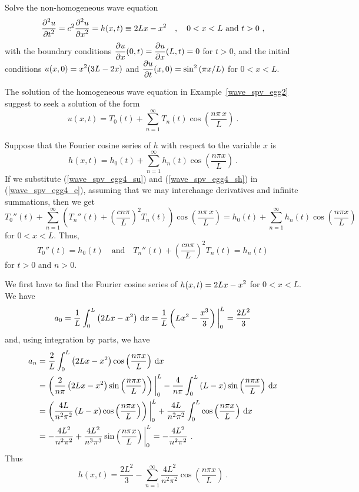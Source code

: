 \begin{egg}
Solve the non-homogeneous wave equation
\begin{equation} \label{wave_spv_egg4_e}
\frac{\displaystyle \partial^{2}{u}} {\displaystyle \partial t^{2}} = c^2 \frac{\displaystyle \partial^{2}{u}} {\displaystyle \partial x^{2}} = h(x,t) \equiv 2Lx-x^2 \quad ,
\quad 0 < x < L \text{ and } t>0 \ ,
\end{equation}
with the boundary conditions
$\displaystyle \frac{\partial{u}}{\partial x}(0,t) = \frac{\partial{u}}{\partial x}(L,t) = 0$ for
$t>0$, and the initial conditions
$\displaystyle u(x,0) = x^2(3L-2x)$ and
$\displaystyle \frac{\partial{u}}{\partial t}(x,0) = \sin^2\left(\pi x/L\right)$ for
$0<x<L$.

The solution of the homogeneous wave equation in
Example~\ref{wave_spv_egg2} suggest to seek a solution of the form
\begin{equation} \label{wave_spv_egg4_su}
u(x,t) = T_0(t) + \sum_{n=1}^\infty T_n(t)
\cos\left(\frac{n\pi\,x}{L}\right) \ .
\end{equation}

Suppose that the Fourier cosine series of $h$ with respect to the
variable $x$ is
\begin{equation} \label{wave_spv_egg4_sh}
h(x,t) = h_0(t) +  \sum_{n=1}^\infty h_n(t) \cos\left(\frac{n\pi x}{L}\right) \ .
\end{equation}
If we substitute (\ref{wave_spv_egg4_su}) and (\ref{wave_spv_egg4_sh}) in
(\ref{wave_spv_egg4_e}), assuming that we may interchange derivatives and
infinite summations, then we get
\[
T_0''(t) + \sum_{n=1}^\infty \left( T_n''(t) +
\left(\frac{c n\pi}{L}\right)^2 T_n(t) \right)
\cos\left(\frac{n\pi\,x}{L}\right) =
h_0(t) +  \sum_{n=1}^\infty h_n(t) \cos\left(\frac{n\pi x}{L}\right)
\]
for $0<x<L$.  Thus,
\[
T_0''(t)  = h_0(t) \quad \text{and} \quad
T_n''(t) + \left(\frac{c n\pi}{L}\right)^2 T_n(t) = h_n(t)
\]
for $t>0$ and $n>0$.

We first have to find the Fourier cosine series of
$\displaystyle h(x,t) = 2Lx-x^2$ for $0<x<L$.  We have
\[
a_0 = \frac{1}{L}\int_0^L \left( 2Lx-x^2 \right) \,\mathrm{d}{x}
= \frac{1}{L} \left( Lx^2 - \frac{x^3}{3} \right)\bigg|_0^L = \frac{2L^2}{3}
\]
and, using integration by parts, we have
\begin{align*}
a_n &= \frac{2}{L} \int_0^L \left(2Lx-x^2\right)
\cos\left(\frac{n\pi x}{L}\right)\,\mathrm{d}{x} \\
&= \left( \frac{2}{n\pi} \left(2Lx-x^2\right)
\sin\left(\frac{n\pi x}{L}\right)\right)\bigg|_0^L
- \frac{4}{n\pi} \int_0^L \left(L-x\right)
\sin\left(\frac{n\pi x}{L}\right) \,\mathrm{d}{x} \\
&= \left( \frac{4L}{n^2\pi^2} \left(L-x\right)
\cos\left(\frac{n\pi x}{L}\right) \right)\bigg|_0^L 
+ \frac{4L}{n^2\pi^2} \int_0^L \cos\left(\frac{n\pi x}{L}\right)
\,\mathrm{d}{x} \\
&= -\frac{4L^2}{n^2\pi^2}
+ \frac{4L^2}{n^3\pi^3} \sin\left(\frac{n\pi x}{L}\right)\bigg|_0^L
= -\frac{4L^2}{n^2\pi^2} \ .
\end{align*}
Thus
\[
h(x,t) = \frac{2L^2}{3} - \sum_{n=1}^\infty \frac{4L^2}{n^2\pi^2}
\cos\left(\frac{n\pi x}{L}\right) \ .
\]


\end{egg}
